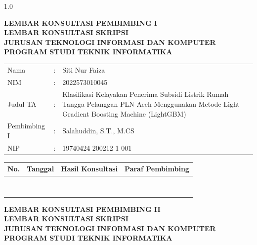\documentclass[12pt, a4paper, onecolumn, oneside]{report}
\begin{document}
\newpage
{}
\thispagestyle{empty}
\begin{spacing}{1.0}

\begin{center}
{\bfseries LEMBAR KONSULTASI PEMBIMBING I}\\
{\bfseries LEMBAR KONSULTASI SKRIPSI}\\[0.2cm]
{\bfseries JURUSAN TEKNOLOGI INFORMASI DAN KOMPUTER}\\
{\bfseries PROGRAM STUDI TEKNIK INFORMATIKA}
\end{center}
\vspace{0.5cm}

\begin{center}
\begin{tabularx}{0.85\textwidth}{@{}p{2.7cm}p{0.3cm}X@{}}
Nama & : & Siti Nur Faiza \\
NIM & : & 2022573010045 \\
Judul TA & : & Klasifikasi Kelayakan Penerima Subsidi Listrik Rumah Tangga Pelanggan PLN Aceh Menggunakan Metode Light Gradient Boosting Machine (LightGBM) \\
Pembimbing I & : & Salahuddin, S.T., M.CS \\
NIP & : & 19740424 200212 1 001 \\
\end{tabularx}
\end{center}

\vspace{0.4cm}

\begin{tabularx}{\textwidth}{|>{\centering\arraybackslash}p{0.8cm}|>{\centering\arraybackslash}p{2.2cm}|>{\centering\arraybackslash}X|>{\centering\arraybackslash}p{2.6cm}|}
\hline
\textbf{No.} & \textbf{Tanggal} & \textbf{Hasil Konsultasi} & \textbf{Paraf Pembimbing} \\
\hline
 & & & \\[1cm]
 & & & \\[1cm]
 & & & \\[1cm]
 & & & \\[1cm]
 & & & \\[1cm]
 & & & \\[1cm]
 & & & \\[1cm]
 & & & \\[1cm]
\hline
\end{tabularx}

\newpage
\thispagestyle{empty}

\begin{center}
{\bfseries LEMBAR KONSULTASI PEMBIMBING II}\\
{\bfseries LEMBAR KONSULTASI SKRIPSI}\\[0.2cm]
{\bfseries JURUSAN TEKNOLOGI INFORMASI DAN KOMPUTER}\\
{\bfseries PROGRAM STUDI TEKNIK INFORMATIKA}
\end{center}
\vspace{0.5cm}


\end{spacing}
\end{document}
